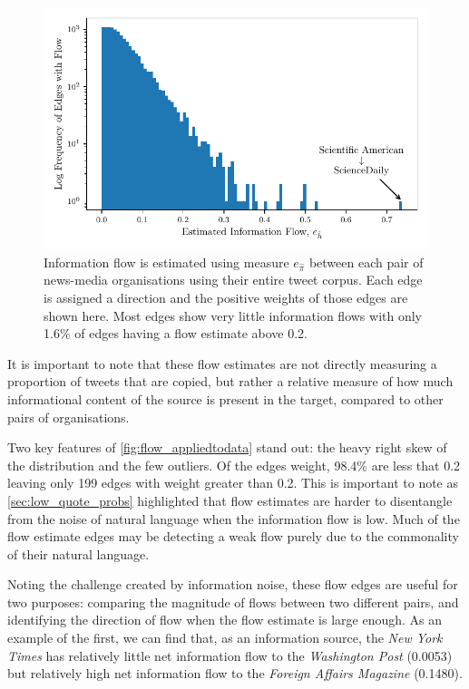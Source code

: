 \begin{figure}[!htbp]
	\centering
	\includegraphics{./chapter3/figs/edge_weights.pdf}
	\caption{Information flow is estimated using measure $e_{\hat{\pi}}$ between each pair of news-media organisations using their entire tweet corpus. Each edge is assigned a direction and the positive weights of those edges are shown here. Most edges show very little information flows with only 1.6\% of edges having a flow estimate above 0.2. }
	\label{fig:flow_appliedtodata}
\end{figure}

It is important to note that these flow estimates are not directly measuring a proportion of tweets that are copied, but rather a relative measure of how much informational content of the source is present in the target, compared to other pairs of organisations. 

Two key features of \autoref{fig:flow_appliedtodata} stand out: the heavy right skew of the distribution and the few outliers. Of the edges weight, 98.4\% are less that 0.2 leaving only 199 edges with weight greater than 0.2. This is important to note as \autoref{sec:low_quote_probs} highlighted that flow estimates are harder to disentangle from the noise of natural language when the information flow is low. Much of the flow estimate edges may be detecting a weak flow purely due to the commonality of their natural language. 

Noting the challenge created by information noise, these flow edges are useful for two purposes: comparing the magnitude of flows between two different pairs, and identifying the direction of flow when the flow estimate is large enough. As an example of the first, we can find that, as an information source, the \emph{New York Times} has relatively little net information flow to the \emph{Washington Post} (0.0053) but relatively high net information flow to the \emph{Foreign Affairs Magazine} (0.1480).

